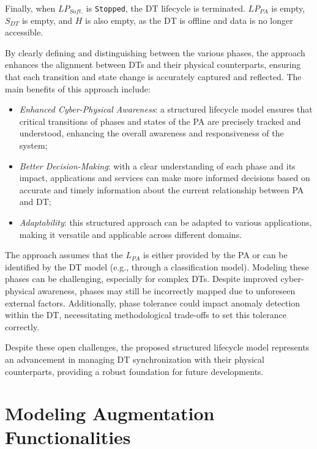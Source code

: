 Finally, when $LP_{Soft.}$ is \texttt{Stopped}, the \ac{DT} lifecycle is terminated. $LP_{PA}$ is empty, $S_{DT}$ is empty, and $H$ is also empty, as the \ac{DT} is offline and data is no longer accessible.

By clearly defining and distinguishing between the various phases, the approach enhances the alignment between \ac{DT}s and their physical counterparts, ensuring that each transition and state change is accurately captured and reflected.
The main benefits of this approach include: 
\begin{itemize}
    \item \textit{Enhanced Cyber-Physical Awareness}: a structured lifecycle model ensures that critical transitions of phases and states of the \ac{PA} are precisely tracked and understood, enhancing the overall awareness and responsiveness of the system;
    \item \textit{Better Decision-Making}: with a clear understanding of each phase and its impact, applications and services can make more informed decisions based on accurate and timely information about the current relationship between \ac{PA} and \ac{DT};
    \item \textit{Adaptability}: this structured approach can be adapted to various applications, making it versatile and applicable across different domains.
\end{itemize}

The approach assumes that the $L_{PA}$ is either provided by the \ac{PA} or can be identified by the \ac{DT} model (e.g., through a classification model).
Modeling these phases can be challenging, especially for complex \acp{DT}.
Despite improved cyber-physical awareness, phases may still be incorrectly mapped due to unforeseen external factors.
Additionally, phase tolerance could impact anomaly detection within the DT, necessitating methodological trade-offs to set this tolerance correctly.

Despite these open challenges, the proposed structured lifecycle model represents an advancement in managing \ac{DT} synchronization with their physical counterparts, providing a robust foundation for future developments.

\section{Modeling Augmentation Functionalities}

